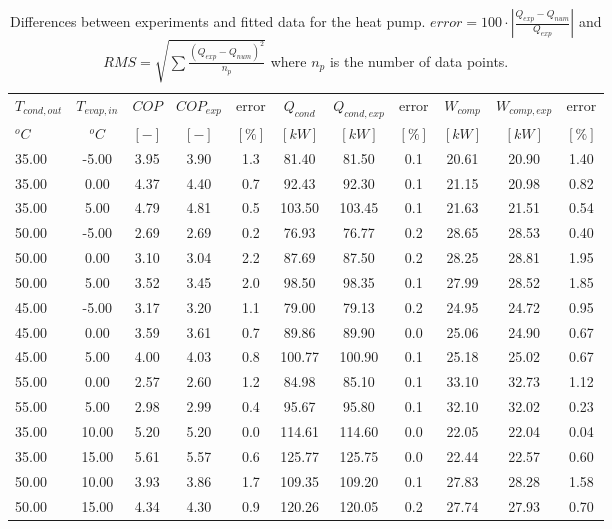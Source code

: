 \documentclass[english]{SPFShortReport}
\begin{document}
\begin{table}[!ht]
\begin{small}
\caption{Differences between experiments and fitted data for the heat pump.          $error=100 \cdot |\frac{Q_{exp}-Q_{num}}{Q_{exp}}|$ and $RMS = \sqrt { \sum{\frac{(Q_{exp}-Q_{num})^2}{n_p}} }$ where $n_p$ is the number of data points.}
\begin{center}
\resizebox{12cm}{!} 
{
\begin{tabular}{l | c c c c c c c c c c } 
\hline
\hline
$T_{cond,out}$ &$T_{evap,in}$ &$COP$ &$COP_{exp}$ &error &$Q_{cond}$ &$Q_{cond,exp}$ &error &$W_{comp}$ &$W_{comp,exp}$ &error \\ 
$^oC$ &$^oC$ &$[-]$ &$[-]$ &$[\%]$ &$[kW]$ &$[kW]$ &$[\%]$ &$[kW]$ &$[kW]$ &$[\%]$\\ 
\hline
35.00  & -5.00 & 3.95 & 3.90 & 1.3 & 81.40 & 81.50 & 0.1 & 20.61 & 20.90 & 1.40\\ 
35.00  & 0.00 & 4.37 & 4.40 & 0.7 & 92.43 & 92.30 & 0.1 & 21.15 & 20.98 & 0.82\\ 
35.00  & 5.00 & 4.79 & 4.81 & 0.5 & 103.50 & 103.45 & 0.1 & 21.63 & 21.51 & 0.54\\ 
50.00  & -5.00 & 2.69 & 2.69 & 0.2 & 76.93 & 76.77 & 0.2 & 28.65 & 28.53 & 0.40\\ 
50.00  & 0.00 & 3.10 & 3.04 & 2.2 & 87.69 & 87.50 & 0.2 & 28.25 & 28.81 & 1.95\\ 
50.00  & 5.00 & 3.52 & 3.45 & 2.0 & 98.50 & 98.35 & 0.1 & 27.99 & 28.52 & 1.85\\ 
45.00  & -5.00 & 3.17 & 3.20 & 1.1 & 79.00 & 79.13 & 0.2 & 24.95 & 24.72 & 0.95\\ 
45.00  & 0.00 & 3.59 & 3.61 & 0.7 & 89.86 & 89.90 & 0.0 & 25.06 & 24.90 & 0.67\\ 
45.00  & 5.00 & 4.00 & 4.03 & 0.8 & 100.77 & 100.90 & 0.1 & 25.18 & 25.02 & 0.67\\ 
55.00  & 0.00 & 2.57 & 2.60 & 1.2 & 84.98 & 85.10 & 0.1 & 33.10 & 32.73 & 1.12\\ 
55.00  & 5.00 & 2.98 & 2.99 & 0.4 & 95.67 & 95.80 & 0.1 & 32.10 & 32.02 & 0.23\\ 
35.00  & 10.00 & 5.20 & 5.20 & 0.0 & 114.61 & 114.60 & 0.0 & 22.05 & 22.04 & 0.04\\ 
35.00  & 15.00 & 5.61 & 5.57 & 0.6 & 125.77 & 125.75 & 0.0 & 22.44 & 22.57 & 0.60\\ 
50.00  & 10.00 & 3.93 & 3.86 & 1.7 & 109.35 & 109.20 & 0.1 & 27.83 & 28.28 & 1.58\\ 
50.00  & 15.00 & 4.34 & 4.30 & 0.9 & 120.26 & 120.05 & 0.2 & 27.74 & 27.93 & 0.70\\ 

\end{tabular}}
\end{center}
\end{small}
\end{table}
\end{document}
